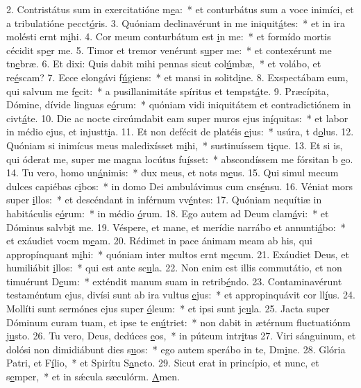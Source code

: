 2. Contristátus sum in exercitatióne m\uline{e}a:~* et conturbátus sum a voce inimíci, et a tribulatióne pecct\uline{ó}ris.
3. Quóniam declinavérunt in me iniquit\uline{á}tes:~* et in ira molésti ernt m\uline{i}hi.
4. Cor meum conturbátum est \uline{i}n me:~* et formído mortis cécidit sp\uline{e}r me.
5. Timor et tremor venérunt s\uline{u}per me:~* et contexérunt me tn\uline{e}bræ.
6. Et dixi: Quis dabit mihi pennas sicut col\uline{ú}mbæ,~* et volábo, et re\uline{é}scam?
7. Ecce elongávi f\uline{ú}giens:~* et mansi in solitd\uline{i}ne.
8. Exspectábam eum, qui salvum me f\uline{e}cit:~* a pusillanimitáte spíritus et tempst\uline{á}te.
9. Præcípita, Dómine, dívide linguas e\uline{ó}rum:~* quóniam vidi iniquitátem et contradictiónem in civt\uline{á}te.
10. Die ac nocte circúmdabit eam super muros ejus in\uline{í}quitas:~* et labor in médio ejus, et injustt\uline{i}a.
11. Et non defécit de platéis \uline{e}jus:~* usúra, t d\uline{o}lus.
12. Quóniam si inimícus meus maledixísset m\uline{i}hi,~* sustinuíssem t\uline{i}que.
13. Et si is, qui óderat me, super me magna locútus fu\uline{í}sset:~* abscondíssem me fórsitan b \uline{e}o.
14. Tu vero, homo un\uline{á}nimis:~* dux meus, et nots m\uline{e}us.
15. Qui simul mecum dulces capiébas c\uline{i}bos:~* in domo Dei ambulávimus cum cns\uline{é}nsu.
16. Véniat mors super \uline{i}llos:~* et descéndant in inférnum vv\uline{é}ntes:
17. Quóniam nequítiæ in habitáculis e\uline{ó}rum:~* in médio \uline{ó}rum.
18. Ego autem ad Deum clam\uline{á}vi:~* et Dóminus salvb\uline{i}t me.
19. Véspere, et mane, et merídie narrábo et annunti\uline{á}bo:~* et exáudiet vocm m\uline{e}am.
20. Rédimet in pace ánimam meam ab his, qui appropínquant m\uline{i}hi:~* quóniam inter multos ernt m\uline{e}cum.
21. Exáudiet Deus, et humiliábit \uline{i}llos:~* qui est ante sc\uline{u}la.
22. Non enim est illis commutátio, et non timuérunt D\uline{e}um:~* exténdit manum suam in retrib\uline{é}ndo.
23. Contaminavérunt testaméntum ejus, divísi sunt ab ira vultus \uline{e}jus:~* et appropinquávit cor ll\uline{í}us.
24. Mollíti sunt sermónes ejus super \uline{ó}leum:~* et ipsi sunt jc\uline{u}la.
25. Jacta super Dóminum curam tuam, et ipse te en\uline{ú}triet:~* non dabit in ætérnum fluctuatiónm j\uline{u}sto.
26. Tu vero, Deus, dedúces \uline{e}os,~* in púteum intr\uline{i}tus
27. Viri sánguinum, et dolósi non dimidiábunt dies s\uline{u}os:~* ego autem sperábo in te, Dm\uline{i}ne.
28. Glória Patri, et F\uline{í}lio,~* et Spirítu S\uline{a}ncto.
29. Sicut erat in princípio, et nunc, et s\uline{e}mper,~* et in sǽcula sæculórm. \uline{A}men.
